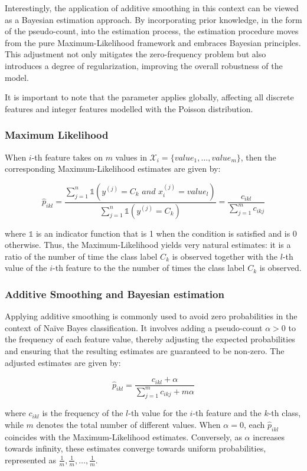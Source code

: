 \documentclass{article}\usepackage[]{graphicx}\usepackage[]{xcolor}
\begin{document}
Interestingly, the application of additive smoothing in this context can be viewed as a Bayesian estimation approach. By incorporating prior knowledge, in the form of the pseudo-count, into the estimation process, the estimation procedure moves from the pure Maximum-Likelihood framework and embraces Bayesian principles. This adjustment not only mitigates the zero-frequency problem but also introduces a degree of regularization, improving the overall robustness of the model.

It is important to note that the \textcolor{darkgreen}{{}} parameter applies globally, affecting all discrete features and integer features modelled with the Poisson distribution.

\subsubsection{Maximum Likelihood}

When $i$-th feature takes on $m$ values in $\mathcal{X}_i = \{value_1,\ldots,value_m\}$, then the corresponding Maximum-Likelihood estimates are given by:

$$\hat{p}_{ikl} = \frac{\sum_{j=1}^n \mathbb{1}(y^{(j)} = C_k \,\, and \,\, x_i^{(j)} = value_l)}{\sum_{j=1}^n \mathbb{1}(y^{(j)} = C_k)} = \frac{c_{ikl}}{\sum_{j=1}^m c_{ikj}}$$

where $\mathbb{1}$ is an indicator function that is 1 when the condition is satisfied and is 0 otherwise. Thus, the Maximum-Likelihood yields very natural estimates: it is a ratio of the number of time the class label $C_k$ is observed together with the $l$-th value of the $i$-th feature to the the number of times the class label $C_k$ is observed.


\subsubsection{Additive Smoothing and Bayesian estimation}

Applying additive smoothing is commonly used to avoid zero probabilities in the context of Na\"ive Bayes classification. It involves adding a pseudo-count $\alpha > 0$ to the frequency of each feature value, thereby adjusting the expected probabilities and ensuring that the resulting estimates are guaranteed to be non-zero. The adjusted estimates are given by:

$$\hat{p}_{ikl} = \frac{c_{ikl} + \alpha}{\sum_{j=1}^m c_{ikj} + m\alpha}$$

where $c_{ikl}$ is the frequency of the $l$-th value for the $i$-th feature and the $k$-th class, while $m$ denotes the total number of different values. When $\alpha = 0$, each $\hat{p}_{ikl}$ coincides with the Maximum-Likelihood estimates. Conversely, as $\alpha$ increases towards infinity, these estimates converge towards uniform probabilities, represented as ${\frac{1}{m}, \frac{1}{m}, \ldots , \frac{1}{m}}$.
\end{document}
